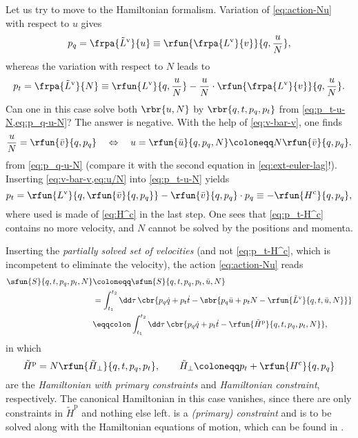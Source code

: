 Let us try to move to the Hamiltonian formalism. Variation of 
\cref{eq:action-Nu} with respect to $u$ gives
\begin{equation}
p_q = \frpa{\tilde L^\text{v}}{u} \equiv
\rfun{\frpa{L^\text{v}}{v}}{q, \frac{u}{N}},
\label{eq:p_q-u-N}
\end{equation}
whereas the variation with respect to $N$ leads to
\begin{equation}
p_t = \frpa{\tilde L^\text{v}}{N} \equiv
\rfun{L^\text{v}}{q, \frac{u}{N}} - \frac{u}{N}\cdot
\rfun{\frpa{L^\text{v}}{v}}{q,\frac{u}{N}}.
\label{eq:p_t-u-N}
\end{equation}
Can one in this case solve both $\rbr{u, N}$ by $\rbr{q, t, p_q, p_t}$ from 
\cref{eq:p_t-u-N,eq:p_q-u-N}? The answer is negative. With the help of 
\cref{eq:v-bar-v}, one finds
\begin{equation}
\frac{u}{N} = \rfun{\bar v}{q, p_q} \quad \Leftrightarrow \quad
u = \rfun{\bar u}{q, p_q, N} \coloneqq N \rfun{\bar v}{q, p_q}.
\label{eq:u/N}
\end{equation}
from \cref{eq:p_q-u-N} (compare it with the second equation in 
\cref{eq:ext-euler-lag}!). Inserting \cref{eq:v-bar-v,eq:u/N} into
\cref{eq:p_t-u-N} yields
\begin{equation}
p_t = \rfun{L^\text{v}}{q, \rfun{\bar v}{q, p_q}} -
\rfun{\bar v}{q, p_q}\cdot p_q
\equiv -\rfun{H^\text{c}}{q, p_q},
\label{eq:p_t-H^c}
\end{equation}
where used is made of \cref{eq:H^c} in the last step. One sees that 
\cref{eq:p_t-H^c} contains no more velocity, and $N$ cannot be solved by the 
positions and momenta.

Inserting the \emph{partially solved set of velocities} (and not 
\cref{eq:p_t-H^c}, which is incompetent to eliminate the velocity), the action
\cref{eq:action-Nu} reads
\begin{align}
\sfun{S}{q, t, p_q, p_t, N} &\coloneqq \sfun{S}{q, t, p_q, p_t, \bar 
u, N} \nonumber \\
&= \int_{t_1}^{t_2}\dd \tau\,\cbr{p_q \dot q + p_t \dot t - \sbr{ p_q \bar u + 
p_t N - \rfun{\tilde L^\text{v}}{q, t, \bar u, N}}} \nonumber \\
& \eqqcolon \int_{t_1}^{t_2}\dd \tau\,
\cbr{p_q \dot q + p_t\dot t - \rfun{\tilde H^\text{p}}{q, t, p_q, p_t, N}},
\end{align}
in which
\begin{equation}
\tilde H^\text{p} = N \rfun{\tilde H_\perp}{q, t, p_q, p_t},\qquad
\tilde H_\perp \coloneqq p_t + \rfun{H^\text{c}}{q, p_q}
\end{equation}
are the \emph{Hamiltonian with primary constraints} and \emph{Hamiltonian 
constraint}, respectively. The canonical Hamiltonian in this case vanishes, 
since there are only constraints in $\tilde H^\text{p}$ and nothing else left. 
 is a \emph{(primary) constraint} and is to be solved along 
with the Hamiltonian equations of motion, which can be found in 
\cite[ch.~2]{Gitman_1990}.

